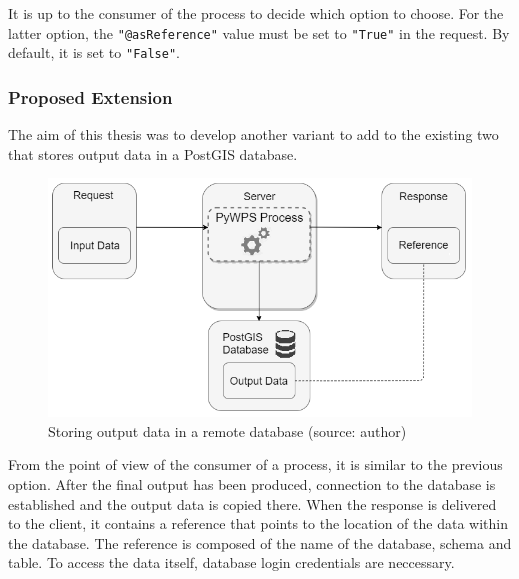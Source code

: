   It is up to the consumer of the process to decide which option to
  choose. For the latter option, the \texttt{"@asReference"} value
  must be set to \texttt{"True"} in the request. \cite{asref} By
  default, it is set to \texttt{"False"}.
  

\subsubsection{Proposed Extension} 

The aim of this thesis was to develop another variant to add to the
existing two that stores output data in a PostGIS database.

\begin{figure}[H] \centering
  \includegraphics[width=350pt]{./pictures/newoption.png}
      \caption[Storing output data in a remote database]{Storing output data in a remote database (source: {author})}
      \label{fig:newoption}
  \end{figure}

From the point of view of the consumer of a process, it is similar to
the previous option. After the final output has been produced,
connection to the database is established and the output data is
copied there. When the  response is delivered to the client,
it contains a reference that points to the location of the data 
within the database. The reference is composed of the name of the database, schema and table. To access the data itself, database login credentials are neccessary.

